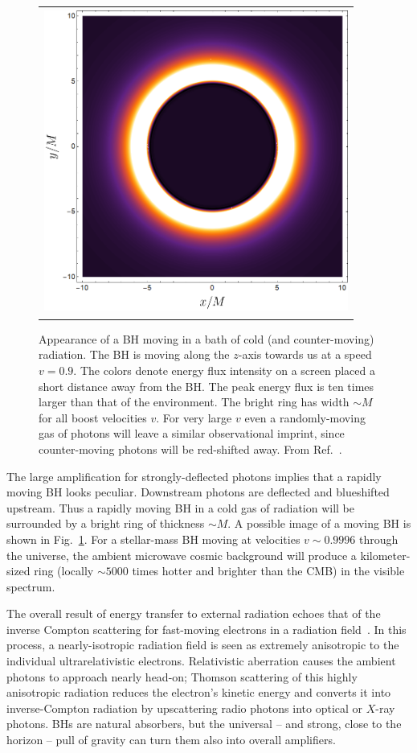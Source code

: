 \documentclass[11pt]{article}
\numberwithin{equation}{section} %
\begin{document}
%
\begin{figure}
\centering
\begin{tabular}{c}
\includegraphics[width=10cm,height=10cm,keepaspectratio]{Image_BH_v09V2.png} 
\end{tabular}
\caption{Appearance of a BH moving in a bath of cold (and counter-moving) radiation. The BH is moving along the $z$-axis towards us at a speed $v=0.9$. The colors denote energy flux intensity on a screen placed a short distance away from the BH. The peak energy flux is ten times larger than that of the environment. The bright ring has width $\sim M$ for all boost velocities $v$. For very large $v$ even a randomly-moving gas of photons will leave a similar observational imprint, since counter-moving photons will be red-shifted away. From Ref.~\cite{Cardoso:2019dte}.}
\label{fig:image}
\end{figure}
%
The large amplification for strongly-deflected photons implies that a rapidly moving BH looks peculiar. Downstream photons are deflected and blueshifted upstream. Thus a rapidly moving BH in a cold gas of radiation will be surrounded by a bright ring of thickness $\sim M$. A possible image of a moving BH is shown in Fig.~\ref{fig:image}. For a stellar-mass BH moving at velocities $v\sim 0.9996$ through the universe, the ambient microwave cosmic background will produce a kilometer-sized ring (locally $\sim 5000$ times hotter and brighter than the CMB) in the visible spectrum. 



The overall result of energy transfer to external radiation echoes that of the inverse Compton scattering for fast-moving electrons in a radiation field~\cite{Beckmann,Cardoso:2019dte}. In this process, a nearly-isotropic radiation field is seen as extremely anisotropic to the individual ultrarelativistic electrons. Relativistic aberration causes the ambient photons to approach nearly head-on; Thomson scattering of this highly anisotropic radiation reduces the electron's kinetic energy and converts it into inverse-Compton radiation by upscattering radio photons into optical or $X$-ray photons. BHs are natural absorbers, but the universal -- and strong, close to the horizon -- pull of gravity can turn them also into overall amplifiers.
\end{document}

